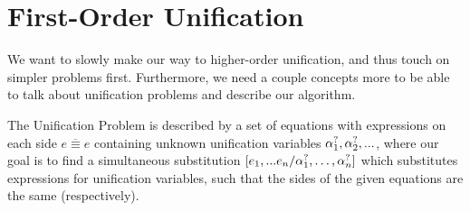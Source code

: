 \documentclass[twoside,12pt,a4paper]{article}
\begin{document}
\begin{prooftree}
\end{prooftree}

\begin{minipage}{0.45\textwidth}
    \begin{prooftree}
    \end{prooftree}    
\end{minipage}
\begin{minipage}{0.45\textwidth}
    \begin{prooftree}
    \end{prooftree}    
\end{minipage}

\begin{prooftree}
\end{prooftree}
\begin{prooftree}
\end{prooftree}    


\section{First-Order Unification}

We want to slowly make our way to higher-order unification, and thus touch on simpler problems first. 
Furthermore, we need a couple concepts more to be able to talk about unification problems and describe our algorithm. 

The Unification Problem is described by a set of equations with expressions on each side $\overline{e\equiv e}$ containing unknown unification variables $\alphaunifvar_1, \alphaunifvar_2, ...$, %
where our goal is to find a simultaneous substitution $[\listofexpr / \alphaunifvar_1, \dots, \alphaunifvar_n]$ which substitutes expressions for unification variables, 
such that the sides of the given equations are the same (respectively). 
\end{document}
